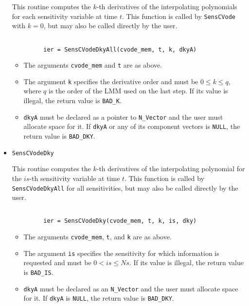 \begin{itemize}
This routine computes the $k$-th derivatives of the interpolating polynomials for
each sensitivity variable at time $t$.
This function is called by {\tt SensCVode} with $k = 0$, but may also be called 
directly by the user.

\begin{verbatim}

         ier = SensCVodeDkyAll(cvode_mem, t, k, dkyA)

\end{verbatim}

\begin{itemize}
\item The arguments {\tt cvode\_mem} and {\tt t} are as above.

\item The argument {\tt k} specifies the derivative order and must be 
  $0 \le k \le q$, where $q$ is the order of the LMM used on the last step.
  If its value is illegal, the return value is {\tt BAD\_K}.

\item {\tt dkyA} must be declared as a pointer to {\tt N\_Vector} and the user
  must allocate space for it. If {\tt dkyA} or any of its component vectors
  is {\tt NULL}, the return value is {\tt BAD\_DKY}.

\end{itemize}

\item {\tt SensCVodeDky}

This routine computes the $k$-th derivatives of the interpolating polynomial for
the $is$-th sensitivity variable at time $t$.
This function is called by {\tt SensCVodeDkyAll} for all sensitivities, but may 
also be called directly by the user.

\begin{verbatim}

         ier = SensCVodeDky(cvode_mem, t, k, is, dky)

\end{verbatim}

\begin{itemize}
\item The arguments {\tt cvode\_mem}, {\tt t}, and {\tt k} are as above.

\item The argument {\tt is} specifies the sensitivity for which information
  is requested and must be $0<is \le Ns$. If its value is illegal, the return
  value is {\tt BAD\_IS}.

\item {\tt dkyA} must be declared as an {\tt N\_Vector} and the user
  must allocate space for it. If {\tt dkyA} is {\tt NULL}, the return value 
  is {\tt BAD\_DKY}.

\end{itemize}


\end{itemize}

